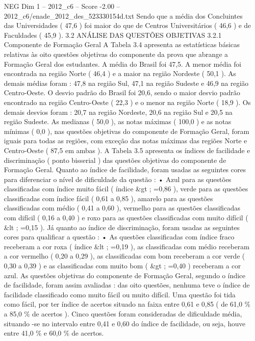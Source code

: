 \begin{textsample}{NEG Dim 1 – 2012\_c6 – Score -2.00 – 2012\_c6/enade\_2012\_des\_523330154d.txt}
Sendo que a média dos Concluintes das Universidades ( 47,6 ) foi maior do que de Centros Universitários ( 46,6 ) e de Faculdades ( 45,9 ). 3.2 ANÁLISE DAS QUESTÕES OBJETIVAS 3.2.1 Componente de Formação Geral A Tabela 3.4 apresenta as estatísticas básicas relativas às oito questões objetivas do componente da prova que abrange a Formação Geral dos estudantes.
A média do Brasil foi 47,5.
A menor média foi encontrada na região Norte ( 46,4 ) e a maior na região Nordeste ( 50,1 ).
As demais médias foram : 47,8 na região Sul, 47,1 na região Sudeste e 46,9 na região Centro-Oeste.
O desvio padrão do Brasil foi 20,6, sendo o maior desvio padrão encontrado na região Centro-Oeste ( 22,3 ) e o menor na região Norte ( 18,9 ).
Os demais desvios foram : 20,7 na região Nordeste, 20,6 na região Sul e 20,5 na região Sudeste.
As medianas ( 50,0 ), as notas máximas ( 100,0 ) e as notas mínimas ( 0,0 ), nas questões objetivas do componente de Formação Geral, foram iguais para todas as regiões, com exceção das notas máximas das regiões Norte e Centro-Oeste ( 87,5 em ambas ).
A Tabela 3.5 apresenta os índices de facilidade e discriminação ( ponto bisserial ) das questões objetivas do componente de Formação Geral.
Quanto ao índice de facilidade, foram usadas as seguintes cores para diferenciar o nível de dificuldade da questão : • Azul para as questões classificadas com índice muito fácil ( índice \&gt ; =0,86 ), verde para as questões classificadas com índice fácil ( 0,61 a 0,85 ), amarelo para as questões classificadas com médio ( 0,41 a 0,60 ), vermelho para as questões classificadas com difícil ( 0,16 a 0,40 ) e roxo para as questões classificadas com muito difícil ( \&lt ; =0,15 ).
Já quanto ao índice de discriminação, foram usadas as seguintes cores para qualificar a questão : • As questões classificadas com índice fraco receberam a cor roxa ( índice \&lt ; =0,19 ), as classificadas com médio receberam a cor vermelho ( 0,20 a 0,29 ), as classificadas com bom receberam a cor verde ( 0,30 a 0,39 ) e as classificadas com muito bom ( \&gt ; =0,40 ) receberam a cor azul.
As questões objetivas do componente de Formação Geral, segundo o índice de facilidade, foram assim avaliadas : das oito questões, nenhuma teve o índice de facilidade classificado como muito fácil ou muito difícil.
Uma questão foi tida como fácil, por ter índice de acertos situado na faixa entre 0,61 e 0,85 ( de 61,0 \% a 85,0 \% de acertos ).
Cinco questões foram consideradas de dificuldade média, situando -se no intervalo entre 0,41 e 0,60 do índice de facilidade, ou seja, houve entre 41,0 \% e 60,0 \% de acertos.

\end{textsample}

